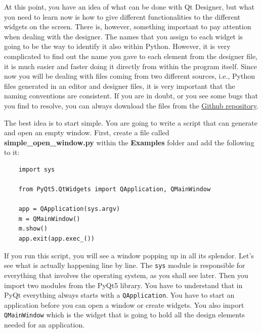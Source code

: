 At this point, you have an idea of what can be done with Qt Designer,
but what you need to learn now is how to give different functionalities
to the different widgets on the screen. There is, however, something
important to pay attention when dealing with the designer. The names
that you assign to each widget is going to be the way to identify it
also within Python. However, it is very complicated to find out the name
you gave to each element from the designer file, it is much easier and
faster doing it directly from within the program itself. Since now you
will be dealing with files coming from two different sources, i.e.,
Python files generated in an editor and designer files, it is very
important that the naming conventions are consistent. If you are in
doubt, or you see some bugs that you find to resolve, you can always
download the files from the
\href{https://github.com/PFTL/SimpleDaq/tree/master/PythonForTheLab/View/GUI}{Github
repository}.


The best idea is to start simple. You are going to write a script that
can generate and open an empty window. First, create a file called
\textbf{simple\_open\_window.py} within the \textbf{Examples} folder and
add the following to it:

\begin{verbatim}
    import sys

    from PyQt5.QtWidgets import QApplication, QMainWindow

    app = QApplication(sys.argv)
    m = QMainWindow()
    m.show()
    app.exit(app.exec_())
\end{verbatim}

If you run this script, you will see a window popping up in all its
splendor. Let's see what is actually happening line by line. The
\texttt{sys} module is responsible for everything that involves the
operating system, as you shall see later. Then you import two modules
from the PyQt5 library. You have to understand that in PyQt everything
always starts with a \texttt{QApplication}. You have to start an
application before you can open a window or create widgets. You also
import \texttt{QMainWindow} which is the widget that is going to hold
all the design elements needed for an application.

